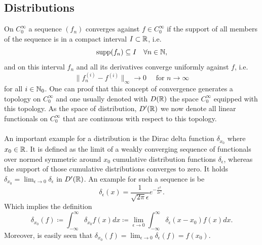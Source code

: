 \subsection*{Distributions}
	On $C_{0}^{\infty}$ a sequence $(f_{n})$ converges against $f \in C_{0}^{\infty}$ if the support of all members of the sequence is in a compact interval $I \subset \mathbb{R}$, i.e.
	$$ \operatorname{supp} (f_{n}) \subseteq I \quad \forall n \in \mathbb{N}, $$
	and on this interval $f_{n}$ and all its derivatives converge uniformly against $f$, i.e.
	\[ \| f_{n}^{(i)} - f^{(i)} \|_{\infty} \rightarrow 0 \quad \text{ for } n \rightarrow \infty \]
	for all $i \in \mathbb{N}_{0}$. One can proof that this concept of convergence generates a topology on $C_{0}^{\infty}$ and one usually denoted with $D(\mathbb{R})$ the space $C_{0}^{\infty}$ equipped with this topology. As the space of distribution, $D'(\mathbb{R})$ we now denote all linear functionals on $C_{0}^{\infty}$ that are continuous with respect to this topology.
~\\ ~\\ %
An important example for a distribution is the Dirac delta function $\delta_{x_{0}}$ where $x_{0} \in \mathbb{R}$. It is defined as the limit of a weakly converging sequence of functionals over normed symmetric around $x_{0}$ cumulative distribution functions $\delta_{\epsilon}$, whereas the support of those cumulative distributions converges to zero. It holds $\delta_{x_{0}} = \lim_{\epsilon \rightarrow 0} \delta_{\epsilon}$ in $D'(\mathbb{R})$. An example for such a sequence is be %
	\[ \delta_{\epsilon}(x) = \frac{1}{\sqrt{2 \pi} \epsilon} e^{-\frac{x^{2}}{2 \epsilon^{2}}}. \]
Which implies the definition
	\[ \delta_{x_{0}}(f) \coloneqq \int_{-\infty}^{\infty} \delta_{x_{0}} f(x) dx \coloneqq \lim_{\epsilon \rightarrow 0} \int_{-\infty}^{\infty} \delta_{\epsilon}(x - x_{0}) f(x) dx. \]
Moreover, is easily seen that $\delta_{x_{0}}(f) = \lim_{\epsilon \rightarrow 0} \delta_{\epsilon}(f) = f(x_{0})$. %
